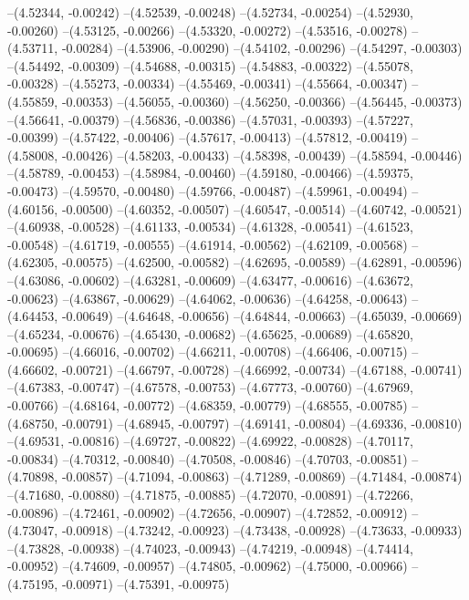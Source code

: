 --(4.52344, -0.00242)
--(4.52539, -0.00248)
--(4.52734, -0.00254)
--(4.52930, -0.00260)
--(4.53125, -0.00266)
--(4.53320, -0.00272)
--(4.53516, -0.00278)
--(4.53711, -0.00284)
--(4.53906, -0.00290)
--(4.54102, -0.00296)
--(4.54297, -0.00303)
--(4.54492, -0.00309)
--(4.54688, -0.00315)
--(4.54883, -0.00322)
--(4.55078, -0.00328)
--(4.55273, -0.00334)
--(4.55469, -0.00341)
--(4.55664, -0.00347)
--(4.55859, -0.00353)
--(4.56055, -0.00360)
--(4.56250, -0.00366)
--(4.56445, -0.00373)
--(4.56641, -0.00379)
--(4.56836, -0.00386)
--(4.57031, -0.00393)
--(4.57227, -0.00399)
--(4.57422, -0.00406)
--(4.57617, -0.00413)
--(4.57812, -0.00419)
--(4.58008, -0.00426)
--(4.58203, -0.00433)
--(4.58398, -0.00439)
--(4.58594, -0.00446)
--(4.58789, -0.00453)
--(4.58984, -0.00460)
--(4.59180, -0.00466)
--(4.59375, -0.00473)
--(4.59570, -0.00480)
--(4.59766, -0.00487)
--(4.59961, -0.00494)
--(4.60156, -0.00500)
--(4.60352, -0.00507)
--(4.60547, -0.00514)
--(4.60742, -0.00521)
--(4.60938, -0.00528)
--(4.61133, -0.00534)
--(4.61328, -0.00541)
--(4.61523, -0.00548)
--(4.61719, -0.00555)
--(4.61914, -0.00562)
--(4.62109, -0.00568)
--(4.62305, -0.00575)
--(4.62500, -0.00582)
--(4.62695, -0.00589)
--(4.62891, -0.00596)
--(4.63086, -0.00602)
--(4.63281, -0.00609)
--(4.63477, -0.00616)
--(4.63672, -0.00623)
--(4.63867, -0.00629)
--(4.64062, -0.00636)
--(4.64258, -0.00643)
--(4.64453, -0.00649)
--(4.64648, -0.00656)
--(4.64844, -0.00663)
--(4.65039, -0.00669)
--(4.65234, -0.00676)
--(4.65430, -0.00682)
--(4.65625, -0.00689)
--(4.65820, -0.00695)
--(4.66016, -0.00702)
--(4.66211, -0.00708)
--(4.66406, -0.00715)
--(4.66602, -0.00721)
--(4.66797, -0.00728)
--(4.66992, -0.00734)
--(4.67188, -0.00741)
--(4.67383, -0.00747)
--(4.67578, -0.00753)
--(4.67773, -0.00760)
--(4.67969, -0.00766)
--(4.68164, -0.00772)
--(4.68359, -0.00779)
--(4.68555, -0.00785)
--(4.68750, -0.00791)
--(4.68945, -0.00797)
--(4.69141, -0.00804)
--(4.69336, -0.00810)
--(4.69531, -0.00816)
--(4.69727, -0.00822)
--(4.69922, -0.00828)
--(4.70117, -0.00834)
--(4.70312, -0.00840)
--(4.70508, -0.00846)
--(4.70703, -0.00851)
--(4.70898, -0.00857)
--(4.71094, -0.00863)
--(4.71289, -0.00869)
--(4.71484, -0.00874)
--(4.71680, -0.00880)
--(4.71875, -0.00885)
--(4.72070, -0.00891)
--(4.72266, -0.00896)
--(4.72461, -0.00902)
--(4.72656, -0.00907)
--(4.72852, -0.00912)
--(4.73047, -0.00918)
--(4.73242, -0.00923)
--(4.73438, -0.00928)
--(4.73633, -0.00933)
--(4.73828, -0.00938)
--(4.74023, -0.00943)
--(4.74219, -0.00948)
--(4.74414, -0.00952)
--(4.74609, -0.00957)
--(4.74805, -0.00962)
--(4.75000, -0.00966)
--(4.75195, -0.00971)
--(4.75391, -0.00975)

